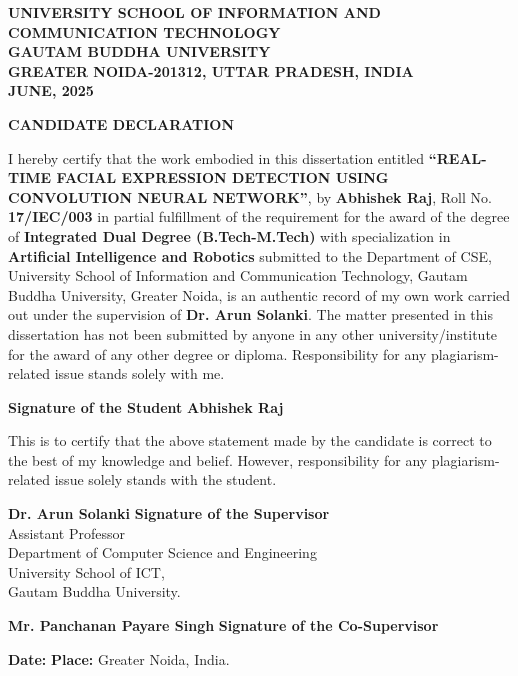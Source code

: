 \newpage
\thispagestyle{empty}  %

\begin{center}
    \textbf{UNIVERSITY SCHOOL OF INFORMATION AND\\
    COMMUNICATION TECHNOLOGY}\\
    \textbf{GAUTAM BUDDHA UNIVERSITY}\\
    \textbf{GREATER NOIDA-201312, UTTAR PRADESH, INDIA}\\
    \textbf{JUNE, 2025}\\
\end{center}
\vspace{1cm}
\begin{center}
    \textbf{\large CANDIDATE DECLARATION}
\end{center}

\vspace{0.5cm}

I hereby certify that the work embodied in this dissertation entitled 
\textbf{“REAL-TIME FACIAL EXPRESSION DETECTION USING CONVOLUTION NEURAL NETWORK”}, 
by \textbf{Abhishek Raj}, Roll No. \textbf{17/IEC/003} in partial fulfillment of the requirement for the award of the degree of 
\textbf{Integrated Dual Degree (B.Tech-M.Tech)} with specialization in 
\textbf{Artificial Intelligence and Robotics} submitted to the Department of CSE, 
University School of Information and Communication Technology, 
Gautam Buddha University, Greater Noida, is an authentic record of my own work carried out under the supervision of 
\textbf{Dr. Arun Solanki}. 
The matter presented in this dissertation has not been submitted by anyone in any other university/institute for the award of any other degree or diploma. 
Responsibility for any plagiarism-related issue stands solely with me.

\vspace{1.5cm}

\noindent
\textbf{Signature of the Student} \hfill \textbf{Abhishek Raj}  %

\vspace{1.5cm}

This is to certify that the above statement made by the candidate is correct to the best of my knowledge and belief. 
However, responsibility for any plagiarism-related issue solely stands with the student.

\vspace{1.5cm}

\noindent
\textbf{Dr. Arun Solanki} \hfill \textbf{Signature of the Supervisor}\\
Assistant Professor\\
Department of Computer Science and Engineering\\
University School of ICT,\\
Gautam Buddha University.\\

\vspace{1.5cm}

\noindent
\textbf{Mr. Panchanan Payare Singh} \hfill \textbf{Signature of the Co-Supervisor}

\vspace{1.5cm}

\noindent
\textbf{Date:} \underline{\hspace{3cm}} \hfill \textbf{Place:} Greater Noida, India.


